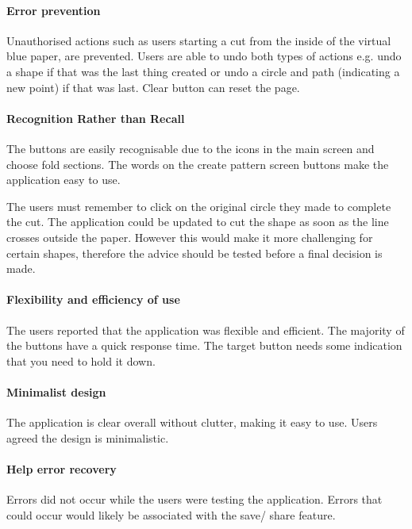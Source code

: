 \documentclass[11pt]{article}
\begin{document}
                \paragraph{Error prevention}
                Unauthorised actions such as users starting a cut from the inside of the virtual blue paper, are prevented. Users are able to undo both types of actions e.g. undo a shape if that was the last thing created or undo a circle and path (indicating a new point) if that was last. Clear button can reset the page. 

                \paragraph{Recognition Rather than Recall}
                The buttons are easily recognisable due to the icons in the main screen and choose fold sections. The words on the create pattern screen buttons make the application easy to use. 
                
                The users must remember to click on the original circle they made to complete the cut. The application could be updated to cut the shape as soon as the line crosses outside the paper. However this would make it more challenging for certain shapes, therefore the advice should be tested before a final decision is made.


                \paragraph{Flexibility and efficiency of use} 
                The users reported that the application was flexible and efficient. The majority of the buttons have a quick response time. The target button needs some indication that you need to hold it down.

                \paragraph{Minimalist design}
                The application is clear overall without clutter, making it easy to use. Users agreed the design is minimalistic. 

                \paragraph{Help error recovery}
                Errors did not occur while the users were testing the application. Errors that could occur would likely be associated with the save/ share feature.
\end{document}
